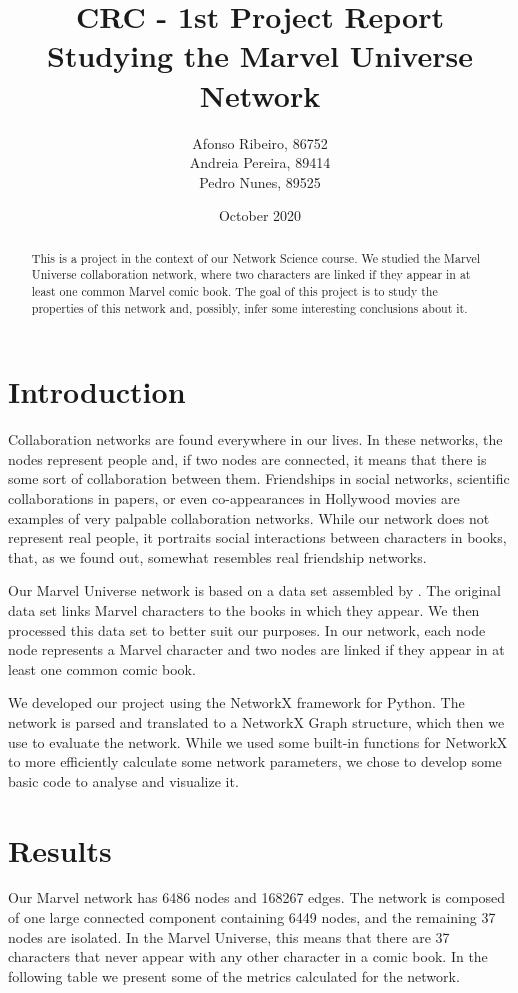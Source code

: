 \documentclass[a4paper]{article}
\title{ \huge{\textbf{CRC - 1st Project Report}} \\
        \Large{Studying the Marvel Universe Network}}
\author{
  Afonso Ribeiro, 86752\\ Andreia Pereira, 89414\\ Pedro Nunes, 89525
}
\date{October 2020}
\begin{document}
\maketitle

\begin{abstract}
This is a project in the context of our Network Science course. We studied the Marvel Universe collaboration network, where two characters are linked if they appear in at least one common Marvel comic book. The goal of this project is to study the properties of this network and, possibly, infer some interesting conclusions about it.
\end{abstract}

\section{Introduction}\label{intro}

Collaboration networks are found everywhere in our lives. In these networks, the nodes represent people and, if two nodes are connected, it means that there is some sort of collaboration between them. Friendships in social networks, scientific collaborations in papers, or even co-appearances in Hollywood movies are examples of very palpable collaboration networks. While our network does not represent real people, it portraits social interactions between characters in books, that, as we found out, somewhat resembles real friendship networks.

Our Marvel Universe network is based on a data set assembled by \cite{cond-mat} . The original data set links Marvel characters to the books in which they appear. We then processed this data set to better suit our purposes. In our network, each node node represents a Marvel character and two nodes are linked if they appear in at least one common comic book.

We developed our project using the NetworkX framework for Python. The network is parsed and translated to a NetworkX Graph structure, which then we use to evaluate the network. While we used some built-in functions for NetworkX to more efficiently calculate some network parameters, we chose to develop some basic code to analyse and visualize it.

\section{Results}\label{res}
Our Marvel network has 6486 nodes and 168267 edges. The network is composed of one large connected component containing 6449 nodes, and the remaining 37 nodes are isolated. In the Marvel Universe, this means that there are 37 characters that never appear with any other character in a comic book. 
In the following table we present some of the metrics calculated for the network.
\end{document}
